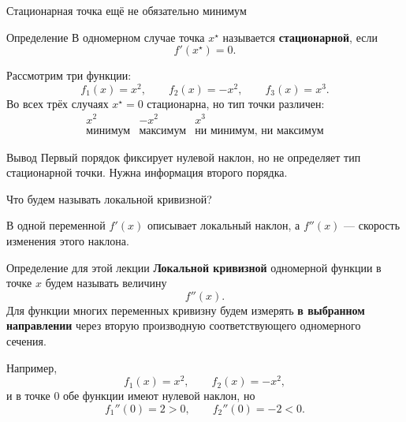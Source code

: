 \documentclass[aspectratio=169,10pt]{beamer}
\begin{document}
\begin{frame}{Стационарная точка ещё не обязательно минимум}
\vspace{0.25em}

\begin{block}{Определение}
В одномерном случае точка $x^\star$ называется \textbf{стационарной}, если
\[
  f'(x^\star)=0.
\]
\end{block}

Рассмотрим три функции:
\[
  f_1(x)=x^2,
  \qquad
  f_2(x)=-x^2,
  \qquad
  f_3(x)=x^3.
\]
Во всех трёх случаях $x^\star=0$ стационарна, но тип точки различен:
\[
\begin{array}{c|c|c}
 x^2 & -x^2 & x^3\\ \hline
 \text{минимум} & \text{максимум} & \text{ни минимум, ни максимум}
\end{array}
\]

\begin{alertblock}{Вывод}
Первый порядок фиксирует нулевой наклон, но не определяет тип стационарной точки. Нужна информация второго порядка.
\end{alertblock}
\end{frame}


\begin{frame}{Что будем называть локальной кривизной?}
\vspace{0.25em}

В одной переменной $f'(x)$ описывает локальный наклон, а $f''(x)$ --- скорость изменения этого наклона.

\begin{block}{Определение для этой лекции}
\textbf{Локальной кривизной} одномерной функции в точке $x$ будем называть величину
\[
  f''(x).
\]
Для функции многих переменных кривизну будем измерять \textbf{в выбранном направлении} через вторую производную соответствующего одномерного сечения.
\end{block}

Например,
\[
  f_1(x)=x^2,
  \qquad
  f_2(x)=-x^2,
\]
и в точке $0$ обе функции имеют нулевой наклон, но
\[
  f_1''(0)=2>0,
  \qquad
  f_2''(0)=-2<0.
\]
\end{frame}
\end{document}
